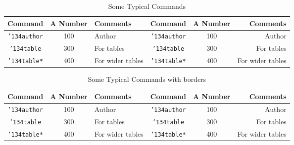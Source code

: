\begin{table*}[h]
	\caption{Some Typical Commands}
	\label{tab:commands}
	\centering
	\begin{tabular}{cclccr}
		\toprule
		Command                    & A Number & Comments         & Command                    & A Number & Comments         \\
		\midrule
		\texttt{{\char'134}author} & 100      & Author           & \texttt{{\char'134}author} & 100      & Author           \\
		\texttt{{\char'134}table}  & 300      & For tables       & \texttt{{\char'134}table}  & 300      & For tables       \\
		\texttt{{\char'134}table*} & 400      & For wider tables & \texttt{{\char'134}table*} & 400      & For wider tables \\
		\bottomrule
	\end{tabular}
\end{table*}

\begin{table*}[h]
	\caption{Some Typical Commands with borders}
	\label{tab:commandswithborders}
	\centering
	\begin{tabular}{|ccl|ccr|} %
		\hline %
		Command                    & A Number & Comments         & Command                    & A Number & Comments         \\
		\hline
		\texttt{{\char'134}author} & 100      & Author           & \texttt{{\char'134}author} & 100      & Author           \\
		\texttt{{\char'134}table}  & 300      & For tables       & \texttt{{\char'134}table}  & 300      & For tables       \\
		\texttt{{\char'134}table*} & 400      & For wider tables & \texttt{{\char'134}table*} & 400      & For wider tables \\
		\hline
	\end{tabular}
\end{table*}


